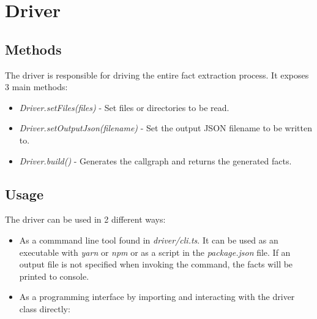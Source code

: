 \section{Driver}

\subsection{Methods}

The driver is responsible for driving the entire fact extraction process. It exposes 3 main methods:

\begin{itemize}
    \item \textit{Driver.setFiles(files)} - Set files or directories to be read.
    \item \textit{Driver.setOutputJson(filename)} - Set the output JSON filename to be written to.
    \item \textit{Driver.build()} - Generates the callgraph and returns the generated facts.
\end{itemize}

\subsection{Usage}

The driver can be used in 2 different ways:
\begin{itemize}
    \item As a commmand line tool found in \textit{driver/cli.ts}. It can be used as an executable with \textit{yarn} or \textit{npm} or as a script in the \textit{package.json} file. If an output file is not specified when invoking the command, the facts will be printed to console.
    \item As a programming interface by importing and interacting with the driver class directly: 
\end{itemize}
